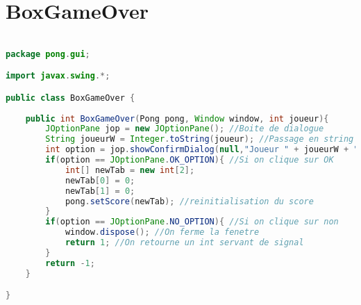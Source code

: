 \section{BoxGameOver}
\begin{lstlisting}[language=Java]

package pong.gui;

import javax.swing.*;

public class BoxGameOver {
	
	public int BoxGameOver(Pong pong, Window window, int joueur){
		JOptionPane jop = new JOptionPane(); //Boite de dialogue
		String joueurW = Integer.toString(joueur); //Passage en string du joueur gagnant 
		int option = jop.showConfirmDialog(null,"Joueur " + joueurW + " a gagne. Voulez-vous rejouer ?", "Jeu fini", JOptionPane.YES_NO_OPTION, JOptionPane.QUESTION_MESSAGE);			
		if(option == JOptionPane.OK_OPTION){ //Si on clique sur OK
			int[] newTab = new int[2];
			newTab[0] = 0;
			newTab[1] = 0;
			pong.setScore(newTab); //reinitialisation du score
		}
		if(option == JOptionPane.NO_OPTION){ //Si on clique sur non
			window.dispose(); //On ferme la fenetre 
			return 1; //On retourne un int servant de signal
		}
		return -1;
	}

}
\end{lstlisting}